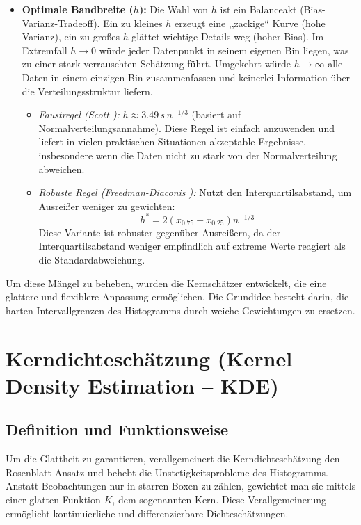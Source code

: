 \documentclass[a4paper, 11pt]{scrartcl}
\begin{document}
\begin{itemize}
	\item \textbf{Optimale Bandbreite ($h$):} Die Wahl von $h$ ist ein Balanceakt (Bias-Varianz-Tradeoff). Ein zu kleines $h$ erzeugt eine ,,zackige`` Kurve (hohe Varianz), ein zu großes $h$ glättet wichtige Details weg (hoher Bias). Im Extremfall $h \to 0$ würde jeder Datenpunkt in seinem eigenen Bin liegen, was zu einer stark verrauschten Schätzung führt. Umgekehrt würde $h \to \infty$ alle Daten in einem einzigen Bin zusammenfassen und keinerlei Information über die Verteilungsstruktur liefern.
	      \begin{itemize}
	      	\item \textit{Faustregel (Scott \cite{Scott1979}):} $h \approx 3.49 \, s \, n^{-1/3}$ (basiert auf Normalverteilungsannahme). Diese Regel ist einfach anzuwenden und liefert in vielen praktischen Situationen akzeptable Ergebnisse, insbesondere wenn die Daten nicht zu stark von der Normalverteilung abweichen.
	      	\item \textit{Robuste Regel (Freedman-Diaconis \cite{FreedmanDiaconis1981}):} Nutzt den Interquartilsabstand, um Ausreißer weniger zu gewichten:
	      	      \[ h^* = 2(x_{0.75} - x_{0.25})n^{-1/3} \]
	      	      Diese Variante ist robuster gegenüber Ausreißern, da der Interquartilsabstand weniger empfindlich auf extreme Werte reagiert als die Standardabweichung.
	      \end{itemize}
\end{itemize}

Um diese Mängel zu beheben, wurden die Kernschätzer entwickelt, die eine glattere und flexiblere Anpassung ermöglichen. Die Grundidee besteht darin, die harten Intervallgrenzen des Histogramms durch weiche Gewichtungen zu ersetzen.

\section{Kerndichteschätzung (Kernel Density Estimation -- KDE)}

\subsection{Definition und Funktionsweise}

Um die Glattheit zu garantieren, verallgemeinert die Kerndichteschätzung den Rosenblatt-Ansatz \cite{Rosenblatt1956, Parzen1962} und behebt die Unstetigkeitsprobleme des Histogramms. Anstatt Beobachtungen nur in starren Boxen zu zählen, gewichtet man sie mittels einer glatten Funktion $K$, dem sogenannten Kern. Diese Verallgemeinerung ermöglicht kontinuierliche und differenzierbare Dichteschätzungen.
\end{document}

